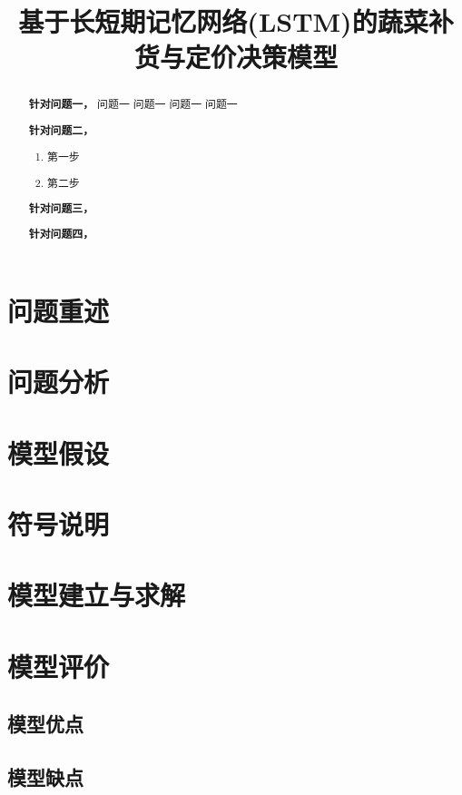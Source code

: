 \documentclass[withoutpreface,bwprint]{cumcmthesis} %
\title{基于长短期记忆网络(LSTM)的蔬菜补货与定价决策模型}
\begin{document}
\maketitle
\nocite{*}


\begin{abstract}

    \textbf{针对问题一，}
    问题一
    问题一
    问题一
    问题一


    \textbf{针对问题二，}
    \begin{enumerate}
    \item 第一步
    \item 第二步
\end{enumerate}

    \textbf{针对问题三，}

    \textbf{针对问题四，}

    \keywords{}
\end{abstract}

\section{问题重述}

\section{问题分析}


\section{模型假设}

\section{符号说明}


\section{模型建立与求解}


\section{模型评价}
\subsection{模型优点}

\subsection{模型缺点}




\begin{appendices}
\end{appendices}
\end{document}

